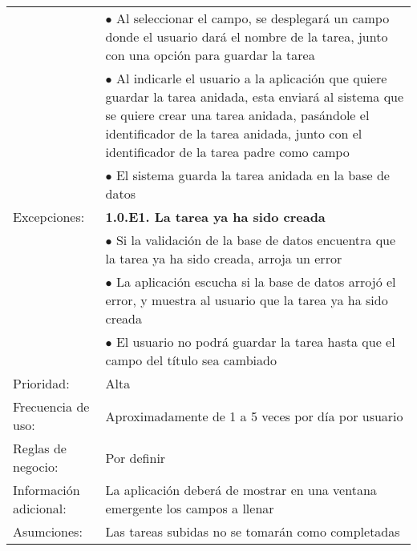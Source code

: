 \begin{center}
\begin{tabular}{p{3cm}p{5cm}p{4cm}p{2cm}}
		     & \multicolumn{3}{p{11cm}}{$\bullet$ Al seleccionar el campo, se desplegar\'a un campo donde el usuario dar\'a el nombre de la tarea, junto con una opci\'on para guardar la tarea}\\
		     & \multicolumn{3}{p{11cm}}{$\bullet$ Al indicarle el usuario a la aplicaci\'on que quiere guardar la tarea anidada, esta enviar\'a al sistema que se quiere crear una tarea anidada, pas\'andole el identificador de la tarea anidada, junto con el identificador de la tarea padre como campo}\\
		     & \multicolumn{3}{p{11cm}}{$\bullet$ El sistema guarda la tarea anidada en la base de datos}\\
  \hline
  Excepciones: & \multicolumn{3}{p{11cm}}{\textbf{1.0.E1. La tarea ya ha sido creada}}\\
	       & \multicolumn{3}{p{11cm}}{$\bullet$ Si la validaci\'on de la base de datos encuentra que la tarea ya ha sido creada, arroja un error}\\
	       & \multicolumn{3}{p{11cm}}{$\bullet$ La aplicaci\'on escucha si la base de datos arroj\'o el error, y muestra al usuario que la tarea ya ha sido creada}\\
	       & \multicolumn{3}{p{11cm}}{$\bullet$ El usuario no podr\'a guardar la tarea hasta que el campo del t\'itulo sea cambiado}\\
  \hline
  Prioridad: & \multicolumn{3}{p{11cm}}{Alta}\\
  \hline
  Frecuencia de uso: & \multicolumn{3}{p{11cm}}{Aproximadamente de 1 a 5 veces por d\'ia por usuario}\\
  \hline
  Reglas de negocio: & \multicolumn{3}{p{11cm}}{Por definir}\\
  \hline
  Informaci\'on adicional: & \multicolumn{3}{p{11cm}}{La aplicaci\'on deber\'a de mostrar en una ventana emergente los campos a llenar}\\
  \hline
  Asumciones: & \multicolumn{3}{p{11cm}}{Las tareas subidas no se tomar\'an como completadas}\\
  \hline
\end{tabular}
\end{center}
